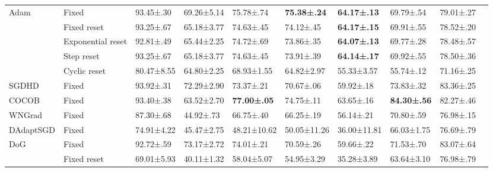 \begin{tabular}{llllllllll}
    \multirow[c]{5}{*}{Adam} & Fixed             & 93.45±.30           & 69.26±5.14          & 75.78±.74           & \bfseries 75.38±.24 & \bfseries 64.17±.13 & 69.79±.54           & 79.01±.27           \\
                             & Fixed reset       & 93.25±.67           & 65.18±3.77          & 74.63±.45           & 74.12±.45           & \bfseries 64.17±.15 & 69.91±.55           & 78.52±.20           \\
                             & Exponential reset & 92.81±.49           & 65.44±2.25          & 74.72±.69           & 73.86±.35           & \bfseries 64.07±.13 & 69.77±.28           & 78.48±.57           \\
                             & Step reset        & 93.25±.67           & 65.18±3.77          & 74.63±.45           & 73.91±.39           & \bfseries 64.14±.17 & 69.92±.55           & 78.50±.36           \\
                             & Cyclic reset      & 80.47±8.55          & 64.80±2.25          & 68.93±1.55          & 64.82±2.97          & 55.33±3.57          & 55.74±.12           & 71.16±.25           \\
    SGDHD                    & Fixed             & 93.92±.31           & 72.29±2.90          & 73.37±.21           & 70.67±.06           & 59.92±.18           & 73.83±.32           & 83.36±.25           \\
    COCOB                    & Fixed             & 93.40±.38           & 63.52±2.70          & \bfseries 77.00±.05 & 74.75±.11           & 63.65±.16           & \bfseries 84.30±.56 & 82.27±.46           \\
    WNGrad                   & Fixed             & 87.30±.68           & 44.92±.73           & 66.75±.40           & 66.25±.19           & 56.14±.21           & 70.80±.59           & 76.98±.15           \\
    DAdaptSGD                & Fixed             & 74.91±4.22          & 45.47±2.75          & 48.21±10.62         & 50.05±11.26         & 36.00±11.81         & 66.03±1.75          & 76.69±.79           \\
    \multirow[c]{6}{*}{DoG}  & Fixed             & 92.72±.59           & 73.17±2.72          & 74.01±.21           & 70.59±.26           & 59.66±.22           & 71.53±.70           & 83.07±.64           \\
                             & Fixed reset       & 69.01±5.93          & 40.11±1.32          & 58.04±5.07          & 54.95±3.29          & 35.28±3.89          & 63.64±3.10          & 76.98±.79           \\

\end{tabular}
